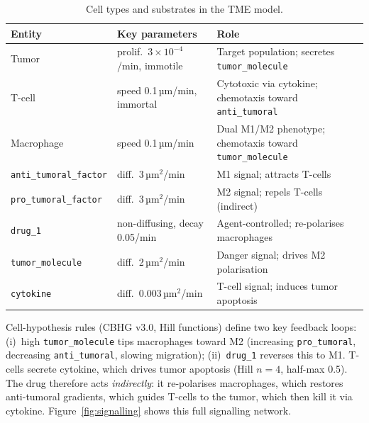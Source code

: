 \documentclass{article}
\begin{document}
\begin{table}[h]
  \caption{Cell types and substrates in the TME model.}
  \label{tab:cells_subs}
  \centering\small
  \begin{tabular}{llp{5.8cm}}
    \toprule
    \textbf{Entity} & \textbf{Key parameters} & \textbf{Role} \\
    \midrule
    Tumor       & prolif.\ $3\!\times\!10^{-4}$/min, immotile & Target population; secretes \texttt{tumor\_molecule} \\
    T-cell      & speed 0.1\,µm/min, immortal & Cytotoxic via cytokine; chemotaxis toward \texttt{anti\_tumoral} \\
    Macrophage  & speed 0.1\,µm/min & Dual M1/M2 phenotype; chemotaxis toward \texttt{tumor\_molecule} \\
    \midrule
    \texttt{anti\_tumoral\_factor} & diff.\ 3\,µm$^2$/min & M1 signal; attracts T-cells \\
    \texttt{pro\_tumoral\_factor}  & diff.\ 3\,µm$^2$/min & M2 signal; repels T-cells (indirect) \\
    \texttt{drug\_1}               & non-diffusing, decay 0.05/min & Agent-controlled; re-polarises macrophages \\
    \texttt{tumor\_molecule}       & diff.\ 2\,µm$^2$/min & Danger signal; drives M2 polarisation \\
    \texttt{cytokine}              & diff.\ 0.003\,µm$^2$/min & T-cell signal; induces tumor apoptosis \\
    \bottomrule
  \end{tabular}
\end{table}

Cell-hypothesis rules (CBHG v3.0, Hill functions) define two key feedback
loops: (i)~high \texttt{tumor\_molecule} tips macrophages toward M2
(increasing \texttt{pro\_tumoral}, decreasing \texttt{anti\_tumoral}, slowing
migration); (ii)~\texttt{drug\_1} reverses this to M1.
T-cells secrete cytokine, which drives tumor apoptosis (Hill $n=4$, half-max 0.5).
The drug therefore acts \emph{indirectly}: it re-polarises macrophages, which
restores anti-tumoral gradients, which guides T-cells to the tumor, which then
kill it via cytokine.
Figure~\ref{fig:signalling} shows this full signalling network.
\end{document}
